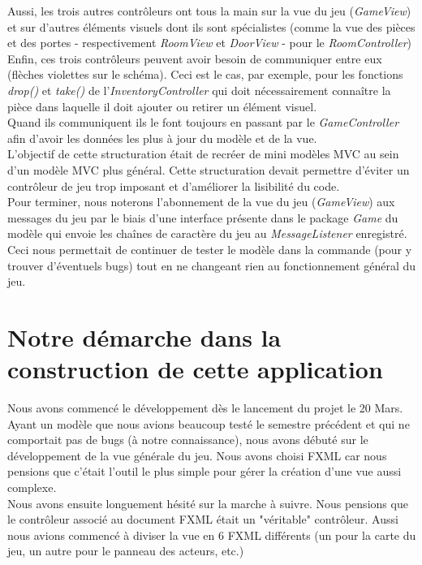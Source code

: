 \documentclass[./standalone.tex]{subfiles}
\begin{document}
Aussi, les trois autres contrôleurs ont tous la main sur la vue du jeu (\textit{GameView}) et sur d'autres éléments visuels dont ils sont spécialistes (comme la vue des pièces et des portes - respectivement \textit{RoomView} et \textit{DoorView} - pour le \textit{RoomController})\\

Enfin, ces trois contrôleurs peuvent avoir besoin de communiquer entre eux (flèches violettes sur le schéma). Ceci est le cas, par exemple, pour les fonctions \textit{drop()} et \textit{take()} de l'\textit{InventoryController} qui doit nécessairement connaître la pièce dans laquelle il doit ajouter ou retirer un élément visuel.\\

Quand ils communiquent ils le font toujours en passant par le \textit{GameController} afin d'avoir les données les plus à jour du modèle et de la vue.\\

L'objectif de cette structuration était de recréer de mini modèles MVC au sein d'un modèle MVC plus général. Cette structuration devait permettre d'éviter un contrôleur de jeu trop imposant et d'améliorer la lisibilité du code.\\

Pour terminer, nous noterons l'abonnement de la vue du jeu (\textit{GameView}) aux messages du jeu par le biais d'une interface présente dans le package \textit{Game} du modèle qui envoie les chaînes de caractère du jeu au \textit{MessageListener} enregistré. Ceci nous permettait de continuer de tester le modèle dans la commande (pour y trouver d'éventuels bugs) tout en ne changeant rien au fonctionnement général du jeu.
\newpage


\section{Notre démarche dans la construction de cette application}
\medskip

Nous avons commencé le développement dès le lancement du projet le 20 Mars. Ayant un modèle que nous avions beaucoup testé le semestre précédent et qui ne comportait pas de bugs (à notre connaissance), nous avons débuté sur le développement de la vue générale du jeu. Nous avons choisi FXML car nous pensions que c'était l'outil le plus simple pour gérer la création d'une vue aussi complexe.\\

Nous avons ensuite longuement hésité sur la marche à suivre. Nous pensions que le contrôleur associé au document FXML était un "véritable" contrôleur. Aussi nous avions commencé à diviser la vue en 6 FXML différents (un pour la carte du jeu, un autre pour le panneau des acteurs, etc.)\\
\end{document}
